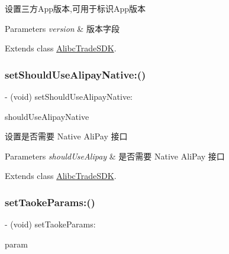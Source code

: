 设置三方\+App版本,可用于标识\+App版本


\begin{DoxyParams}{Parameters}
{\em version} & 版本字段 \\
\hline
\end{DoxyParams}


Extends class \mbox{\hyperlink{interface_alibc_trade_s_d_k_aaf25692948a3bcad5f2099789c92b5c8}{Alibc\+Trade\+S\+DK}}.

\mbox{\label{category_alibc_trade_s_d_k_07_settings_08_aacfcf26210f84b53ce09dd44e68dd91a}} 
\subsubsection{\texorpdfstring{set\+Should\+Use\+Alipay\+Native\+:()}{setShouldUseAlipayNative:()}}
{\footnotesize\ttfamily -\/ (void) set\+Should\+Use\+Alipay\+Native\+: \begin{DoxyParamCaption}\item[{(B\+O\+OL)}]{should\+Use\+Alipay\+Native }\end{DoxyParamCaption}}

设置是否需要 Native Ali\+Pay 接口


\begin{DoxyParams}{Parameters}
{\em should\+Use\+Alipay} & 是否需要 Native Ali\+Pay 接口 \\
\hline
\end{DoxyParams}


Extends class \mbox{\hyperlink{interface_alibc_trade_s_d_k_aacfcf26210f84b53ce09dd44e68dd91a}{Alibc\+Trade\+S\+DK}}.

\mbox{\label{category_alibc_trade_s_d_k_07_settings_08_aa6e5c46a89ab3539e6d95b827d31bae5}} 
\subsubsection{\texorpdfstring{set\+Taoke\+Params\+:()}{setTaokeParams:()}}
{\footnotesize\ttfamily -\/ (void) set\+Taoke\+Params\+: \begin{DoxyParamCaption}\item[{(\mbox{\hyperlink{interface_alibc_trade_taoke_params}{Alibc\+Trade\+Taoke\+Params}} $\ast$)}]{param }\end{DoxyParamCaption}}

